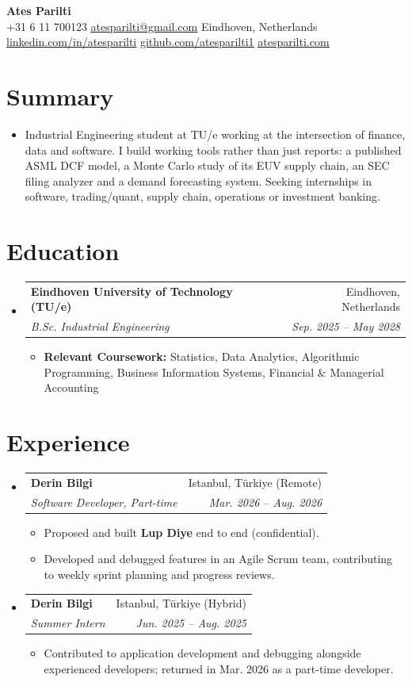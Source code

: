\documentclass[letterpaper,11pt]{article}
\makeatletter
\newlength{\headgap}
\newcommand{\resumeItem}[1]{\item{#1}\vspace{-2pt}}
\newcommand{\resumeSubheading}[4]{
  \vspace{-2pt}\item
    \begin{tabular*}{0.98\textwidth}[t]{l@{\extracolsep{\fill}}r}
      \textbf{#1} & #2 \\
      \textit{#3} & \textit{#4} \\
    \end{tabular*}\vspace{\headgap}
}
\newcommand{\sep}{\enspace\textbar\enspace}
\newcommand{\resumeSubHeadingListStart}{\begin{itemize}[leftmargin=0.1in, label={}]}
\newcommand{\resumeSubHeadingListEnd}{\end{itemize}}
\newcommand{\resumeItemListStart}{\begin{itemize}[leftmargin=0.2in, label=\textbullet, itemsep=0pt, topsep=2pt]}
\newcommand{\resumeItemListEnd}{\end{itemize}\vspace{-4pt}}
\makeatother
\begin{document}
\small

\begin{center}
    {\LARGE\bfseries Ates Parilti} \\ \vspace{3pt}
    +31 6 11 700123 \sep \href{mailto:atesparilti@gmail.com}{\underline{atesparilti@gmail.com}} \sep Eindhoven, Netherlands \\
    \href{https://linkedin.com/in/atesparilti}{\underline{linkedin.com/in/atesparilti}} \sep
    \href{https://github.com/atesparilti1}{\underline{github.com/atesparilti1}} \sep
    \href{https://atesparilti.com}{\underline{atesparilti.com}}
\end{center}
\vspace{-6pt}


\section{Summary}
\begin{itemize}[leftmargin=0.1in, label={}]
  \item Industrial Engineering student at TU/e working at the intersection of finance, data and software. I build working tools rather than just reports: a published ASML DCF model, a Monte Carlo study of its EUV supply chain, an SEC filing analyzer and a demand forecasting system. Seeking internships in software, trading/quant, supply chain, operations or investment banking.
\end{itemize}


\section{Education}
  \resumeSubHeadingListStart
    \resumeSubheading
      {Eindhoven University of Technology (TU/e)}{Eindhoven, Netherlands}
      {B.Sc. Industrial Engineering}{Sep. 2025 -- May 2028}
      \resumeItemListStart
        \resumeItem{\textbf{Relevant Coursework:} Statistics, Data Analytics, Algorithmic Programming, Business Information Systems, Financial \& Managerial Accounting}
      \resumeItemListEnd
  \resumeSubHeadingListEnd


\section{Experience}
  \resumeSubHeadingListStart
    \resumeSubheading
      {Derin Bilgi}{Istanbul, T\"urkiye (Remote)}
      {Software Developer, Part-time}{Mar. 2026 -- Aug. 2026}
      \resumeItemListStart
        \resumeItem{Proposed and built \textbf{Lup Diye} end to end (confidential).}
        \resumeItem{Developed and debugged features in an Agile Scrum team, contributing to weekly sprint planning and progress reviews.}
      \resumeItemListEnd
    \resumeSubheading
      {Derin Bilgi}{Istanbul, T\"urkiye (Hybrid)}
      {Summer Intern}{Jun. 2025 -- Aug. 2025}
      \resumeItemListStart
        \resumeItem{Contributed to application development and debugging alongside experienced developers; returned in Mar. 2026 as a part-time developer.}
      \resumeItemListEnd
  \resumeSubHeadingListEnd
\end{document}
